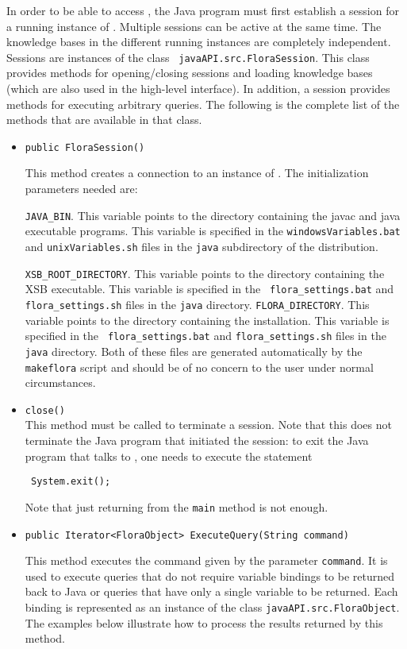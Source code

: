 In order to be able to access \FLORA, the Java program must first establish
a session for a running instance of \FLORA. Multiple sessions can be active
at the same time. The knowledge bases in the different running instances
are completely independent. Sessions are instances of
the class {\tt
javaAPI.src.FloraSession}. This class provides methods
for opening/closing sessions and loading \FLORA knowledge bases
(which are also used in the high-level
interface). In addition, a session provides 
methods for executing arbitrary \FLORA queries. The following is the complete
list of the methods that are available in that class.
\begin{itemize}
\item
\begin{verbatim}
public FloraSession()
\end{verbatim}
    This method creates a connection to an instance of \FLORA.
The initialization parameters needed are:

{\tt JAVA\_BIN}. This variable points to the directory containing
the javac and java executable programs. This variable is specified in
the {\tt windowsVariables.bat} and  {\tt unixVariables.sh}  files in the
{\tt java} subdirectory of the \FLORA distribution.

{\tt XSB\_ROOT\_DIRECTORY}. This variable points to the directory
containing the XSB executable. This variable is specified in the {\tt
  flora\_settings.bat} and {\tt flora\_settings.sh} files in the {\tt java}
directory.  {\tt FLORA\_DIRECTORY}. This variable points to the directory
containing the \FLORA installation. This variable is specified in the {\tt
  flora\_settings.bat} and {\tt flora\_settings.sh} files in the {\tt java}
directory.  Both of these files are generated automatically by the {\tt
  makeflora} script and should be of no concern to the user under normal
circumstances.
\item {\tt close()} \\
  This method must be called to terminate a \FLORA session. Note that this does
  not terminate the Java program that initiated the session:
  to exit the Java program that talks to \FLORA, one needs to execute
  the statement
\begin{verbatim}
 System.exit();  
\end{verbatim}
  Note that just returning from the {\tt main} method is not enough. 

\item
\begin{verbatim}
public Iterator<FloraObject> ExecuteQuery(String command)
\end{verbatim}
    This method executes the \FLORA command given by the
parameter {\tt command}.  It is used to execute \FLORA queries that
do not require variable bindings to be returned back to Java or queries that
have only
a single variable to be returned. Each binding is represented as
an instance of the class {\tt javaAPI.src.FloraObject}.
The examples below illustrate how to process the results returned by this
method.


\end{itemize}
